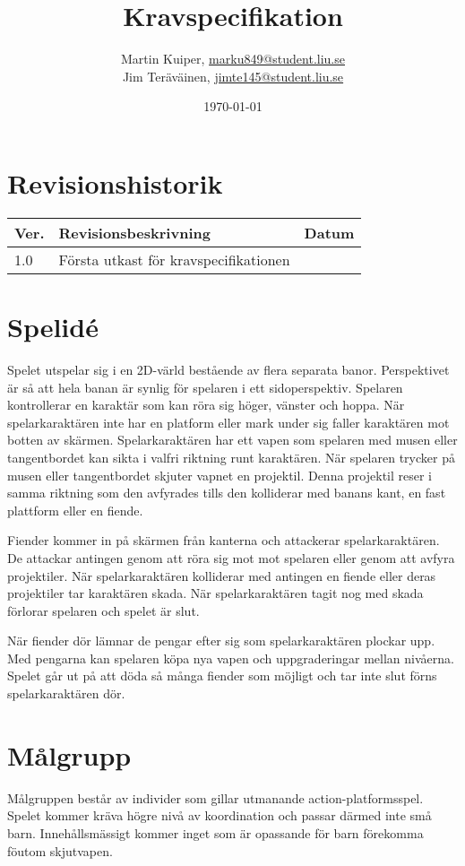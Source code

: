 \documentclass{TDP005mall}
\author{Martin Kuiper, \url{marku849@student.liu.se}\\
  Jim Teräväinen, \url{jimte145@student.liu.se}}
\title{Kravspecifikation}
\date{\today}
\begin{document}
\projectpage
\section{Revisionshistorik}
\begin{table}[!h]
\begin{tabularx}{\linewidth}{|l|X|l|}
\hline
Ver. & Revisionsbeskrivning & Datum \\\hline
1.0 & Första utkast för kravspecifikationen &  \\\hline
\end{tabularx}
\end{table}


\section{Spelidé}
Spelet utspelar sig i en 2D-värld bestående av flera separata banor. Perspektivet är så att hela banan är synlig för spelaren i ett sidoperspektiv. Spelaren kontrollerar en karaktär som kan röra sig höger, vänster och hoppa. När spelarkaraktären inte har en platform eller mark under sig faller karaktären mot botten av skärmen. Spelarkaraktären har ett vapen som spelaren med musen eller tangentbordet kan sikta i valfri riktning runt karaktären. När spelaren trycker på musen eller tangentbordet skjuter vapnet en projektil. Denna projektil reser i samma riktning som den avfyrades tills den kolliderar med banans kant, en fast plattform eller en fiende. 

Fiender kommer in på skärmen från kanterna och attackerar spelarkaraktären. De attackar antingen genom att röra sig mot mot spelaren eller genom att avfyra projektiler. När spelarkaraktären kolliderar med antingen en fiende eller deras projektiler tar karaktären skada. När spelarkaraktären tagit nog med skada förlorar spelaren och spelet är slut.

När fiender dör lämnar de pengar efter sig som spelarkaraktären plockar upp. Med pengarna kan spelaren köpa nya vapen och uppgraderingar mellan nivåerna. Spelet går ut på att döda så många fiender som möjligt och tar inte slut förns spelarkaraktären dör.


\section{Målgrupp}
Målgruppen består av individer som gillar utmanande action-platformsspel. Spelet kommer kräva högre nivå av koordination och passar därmed inte små barn. Innehållsmässigt kommer inget som är opassande för barn förekomma föutom skjutvapen.
\end{document}
